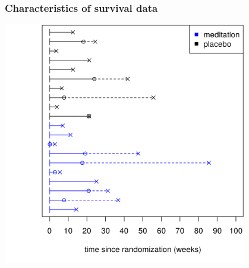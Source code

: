 \documentclass[12pt, 
hyperref={colorlinks=true, linkcolor=blue, urlcolor=cyan},dvipsnames]{beamer}
\begin{document}
\begin{frame}
\frametitle{Characteristics of survival data}
\centering
\includegraphics[width=0.8\textwidth]{figs/meditation_censored_rand_time.png}
\end{frame}
\end{document}
